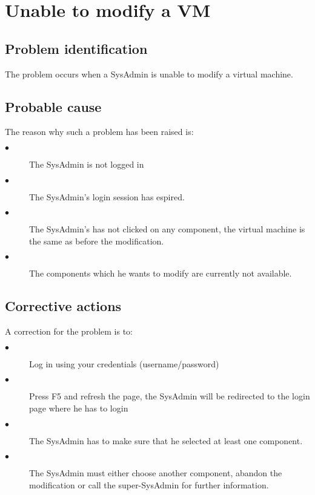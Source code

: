 \section{Unable to modify a VM}

\subsection{Problem identification}
The problem occurs when a SysAdmin is unable to modify a virtual
machine.

\subsection{Probable cause}

The reason why such a problem has been raised is:\\
\begin{description}
  \item[$\bullet$] The SysAdmin is not logged in
  \item[$\bullet$] The SysAdmin's login session has espired.
  \item[$\bullet$] The SysAdmin's has not clicked on any component, the virtual
  machine is the same as before the modification.
  \item[$\bullet$] The components which he wants to modify are currently not
  available.
\end{description}


\subsection{Corrective actions}

A correction for the problem is to:\\
\begin{description}
  \item[$\bullet$] Log in using your credentials (username/password)
  \item[$\bullet$] Press F5 and refresh the page, the SysAdmin will be redirected to
  the login page where he has to login
  \item[$\bullet$] The SysAdmin has to make sure that he selected at least one
  component.
  \item[$\bullet$] The SysAdmin must either choose another component, abandon
  the modification or call the super-SysAdmin for further information.
\end{description}